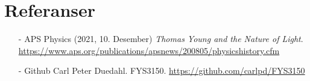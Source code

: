 \documentclass[reprint,english,notitlepage]{revtex4-2}  %
\begin{document}
\section{Referanser}  %
\begin{itemize}
	\item[-] APS Physics (2021, 10. Desember) \emph{Thomas Young and the Nature of Light}. \url{https://www.aps.org/publications/apsnews/200805/physicshistory.cfm }
	\item[-] Github Carl Peter Duedahl. FYS3150. \url{https://github.com/carlpd/FYS3150 }
\end{itemize}
\end{document}
